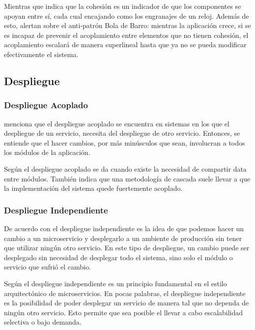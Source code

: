 Mientras que \cite{percival2020architecture} indica que la cohesión es un indicador de que los componentes
se apoyan entre sí, cada cual encajando como los engranajes de un reloj.
Además de esto, alertan sobre el anti-patrón Bola de Barro: mientras la aplicación crece, si se es incapaz de
prevenir el acoplamiento entre elementos que no tienen cohesión, el acoplamiento escalará de manera superlineal
hasta que ya no se pueda modificar efectivamente el sistema.


\subsection{Despliegue}


\subsubsection{Despliegue Acoplado}

\cite{newman2019monolith} menciona que el despliegue acoplado se encuentra en sistemas en los que el
despliegue de un servicio, necesita del despliegue de otro servicio.
Entonces, se entiende que el hacer cambios, por más minúsculos que sean, involucran a todos los módulos
de la aplicación.

Según \cite{nadareishvili2016microservice} el despliegue acoplado se da cuando existe la necesidad
de compartir data entre módulos.
También indica que una metodología de cascada suele llevar a que la implementación del sistema
quede fuertemente acoplado.


\subsubsection{Despliegue Independiente}

De acuerdo con \cite{newman2019monolith} el despliegue independiente es la idea de que podemos
hacer un cambio a un microservicio y desplegarlo a un ambiente de producción sin tener que utilizar
ningún otro servicio.
En este tipo de despliegue, un cambio puede ser desplegado sin necesidad de desplegar todo el sistema,
sino solo el módulo o servicio que sufrió el cambio.

Según \cite{nadareishvili2016microservice} el despliegue independiente es un principio fundamental
en el estilo arquitectónico de microservicios.
En pocas palabras, el despliegue independiente es la posibilidad de poder desplegar un 
servicio de manera tal que no dependa de ningún otro servicio.
Esto permite que sea posible el llevar a cabo escalabilidad selectiva o bajo demanda.


